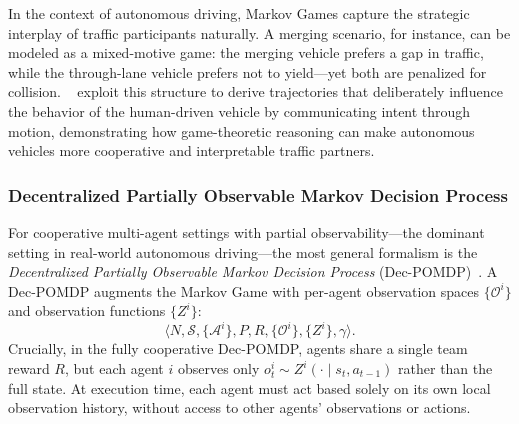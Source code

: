 \documentclass[12pt, a4paper]{article}
\begin{document}
In the context of autonomous driving, Markov Games capture the strategic
interplay of traffic participants naturally.  A merging scenario, for instance,
can be modeled as a mixed-motive game: the merging vehicle prefers a gap in
traffic, while the through-lane vehicle prefers not to yield---yet both are
penalized for collision.  \citeauthor{sadigh2016planning}~\cite{sadigh2016planning}
exploit this structure to derive trajectories that deliberately influence the
behavior of the human-driven vehicle by communicating intent through motion,
demonstrating how game-theoretic reasoning can make autonomous vehicles more
cooperative and interpretable traffic partners.

\subsubsection*{Decentralized Partially Observable Markov Decision Process}

For cooperative multi-agent settings with partial observability---the dominant
setting in real-world autonomous driving---the most general formalism is the
\emph{Decentralized Partially Observable Markov Decision Process}
(Dec-POMDP)~\cite{bernstein2002complexity}.  A Dec-POMDP augments the Markov
Game with per-agent observation spaces $\{\mathcal{O}^i\}$ and observation
functions $\{Z^i\}$:
\[
  \langle N, \mathcal{S}, \{\mathcal{A}^i\}, P, R, \{\mathcal{O}^i\}, \{Z^i\}, \gamma \rangle.
\]
Crucially, in the fully cooperative Dec-POMDP, agents share a single team
reward $R$, but each agent $i$ observes only
$o^i_t \sim Z^i(\cdot \mid s_t, a_{t-1})$ rather than the full state.
At execution time, each agent must act based solely on its own local
observation history, without access to other agents' observations or actions.
\end{document}
